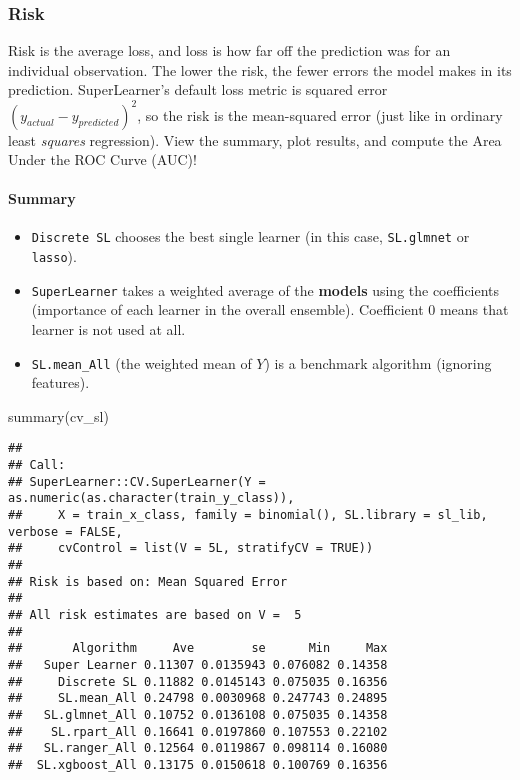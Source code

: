 \documentclass[
]{book}
\newenvironment{Shaded}{\begin{snugshade}}{\end{snugshade}}
\newcommand{\FunctionTok}[1]{\textcolor[rgb]{0.00,0.00,0.00}{#1}}
\newcommand{\NormalTok}[1]{#1}
\providecommand{\tightlist}{%
  \setlength{\itemsep}{0pt}\setlength{\parskip}{0pt}}
\begin{document}
\hypertarget{risk}{%
\subsubsection{Risk}\label{risk}}

Risk is the average loss, and loss is how far off the prediction was for an individual observation. The lower the risk, the fewer errors the model makes in its prediction. SuperLearner's default loss metric is squared error \((y_{actual} - y_{predicted})^2\), so the risk is the mean-squared error (just like in ordinary least \emph{squares} regression). View the summary, plot results, and compute the Area Under the ROC Curve (AUC)!

\hypertarget{summary}{%
\paragraph{Summary}\label{summary}}

\begin{itemize}
\tightlist
\item
  \texttt{Discrete\ SL} chooses the best single learner (in this case, \texttt{SL.glmnet} or \texttt{lasso}).
\item
  \texttt{SuperLearner} takes a weighted average of the \textbf{models} using the coefficients (importance of each learner in the overall ensemble). Coefficient 0 means that learner is not used at all.
\item
  \texttt{SL.mean\_All} (the weighted mean of \(Y\)) is a benchmark algorithm (ignoring features).
\end{itemize}

\begin{Shaded}
\begin{Highlighting}[]
\FunctionTok{summary}\NormalTok{(cv\_sl)}
\end{Highlighting}
\end{Shaded}

\begin{verbatim}
## 
## Call:  
## SuperLearner::CV.SuperLearner(Y = as.numeric(as.character(train_y_class)),  
##     X = train_x_class, family = binomial(), SL.library = sl_lib, verbose = FALSE,  
##     cvControl = list(V = 5L, stratifyCV = TRUE)) 
## 
## Risk is based on: Mean Squared Error
## 
## All risk estimates are based on V =  5 
## 
##       Algorithm     Ave        se      Min     Max
##   Super Learner 0.11307 0.0135943 0.076082 0.14358
##     Discrete SL 0.11882 0.0145143 0.075035 0.16356
##     SL.mean_All 0.24798 0.0030968 0.247743 0.24895
##   SL.glmnet_All 0.10752 0.0136108 0.075035 0.14358
##    SL.rpart_All 0.16641 0.0197860 0.107553 0.22102
##   SL.ranger_All 0.12564 0.0119867 0.098114 0.16080
##  SL.xgboost_All 0.13175 0.0150618 0.100769 0.16356
\end{verbatim}
\end{document}
